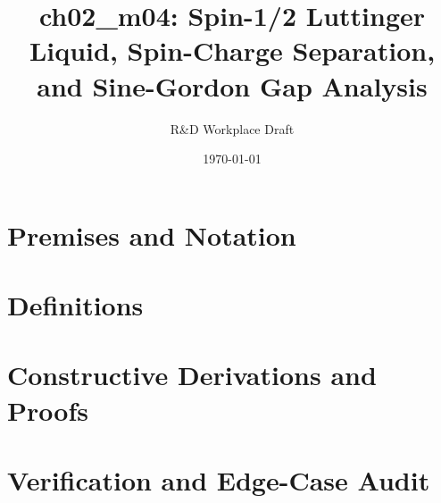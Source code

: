 \documentclass[11pt,a4paper]{article}
\title{\textbf{ch02\_m04: Spin-1/2 Luttinger Liquid, Spin-Charge Separation, and Sine-Gordon Gap Analysis}}
\author{R\&D Workplace Draft}
\date{\today}
\theoremstyle{definition}
\theoremstyle{plain}
\theoremstyle{remark}
\begin{document}
\maketitle

\section{Premises and Notation}

\section{Definitions}

\section{Constructive Derivations and Proofs}

\section{Verification and Edge-Case Audit}
\end{document}
